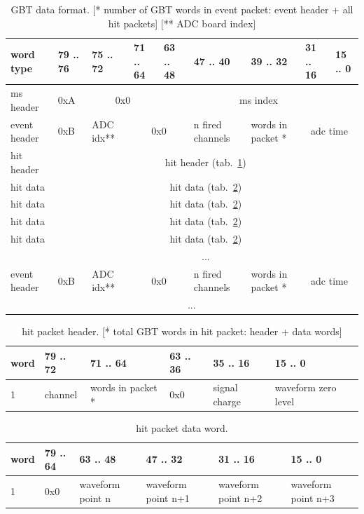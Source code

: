 \documentclass{article}
\begin{document}
\begin{table}[H]
\centering
\begin{tabular}{| l | l | l | l | l | l | l | l | l |}
\hline
word type & 79 .. 76 & 75 .. 72 & 71 .. 64 & 63 .. 48 & 47 .. 40 & 39 .. 32 & 31 .. 16 & 15 .. 0 \\ \hline
ms header & 0xA & \multicolumn{2}{c|}{0x0}  & \multicolumn{5}{c|}{ms index} \\ \hline
event header & 0xB & ADC idx** & \multicolumn{2}{c|}{0x0} & n fired channels & words in packet * & \multicolumn{2}{c|}{adc time} \\ \hline
hit header & \multicolumn{8}{c|}{hit header (tab.~\ref{tab1})} \\ \hline
hit data & \multicolumn{8}{c|}{hit data (tab.~\ref{tab2})} \\ \hline
hit data & \multicolumn{8}{c|}{hit data (tab.~\ref{tab2})} \\ \hline
hit data & \multicolumn{8}{c|}{hit data (tab.~\ref{tab2})} \\ \hline
hit data & \multicolumn{8}{c|}{hit data (tab.~\ref{tab2})} \\ \hline
  & \multicolumn{8}{c|}{ ... } \\ \hline

event header & 0xB & ADC idx** & \multicolumn{2}{c|}{0x0} & n fired channels & words in packet * & \multicolumn{2}{c|}{adc time} \\ \hline
  & \multicolumn{7}{c|}{ ... } \\ \hline

\end{tabular}
\caption{GBT data format. [* number of GBT words in event packet: event header + all hit packets] [** ADC board index] \label{tab1}}
\end{table}

\begin{table}[H]
\centering
\begin{tabular}{| l | l | l | l | l | l |}
\hline
word & 79 .. 72 & 71 .. 64 & 63 .. 36 & 35 .. 16 & 15 .. 0 \\ \hline
1 & channel &words in packet *& 0x0 & signal charge & waveform zero level \\ \hline
\end{tabular}
\caption{hit packet header. [* total GBT words in hit packet: header + data words]\label{tab2}}
\end{table}

\begin{table}[H]
\centering
\begin{tabular}{| l | l | l | l | l | l |}
\hline
word & 79 .. 64 & 63 .. 48 & 47 .. 32 & 31 .. 16 & 15 .. 0 \\ \hline
1 & 0x0 & waveform point n & waveform point n+1 & waveform point n+2 & waveform point n+3 \\ \hline
\end{tabular}
\caption{hit packet data word.\label{tab3}}
\end{table}
\end{document}
